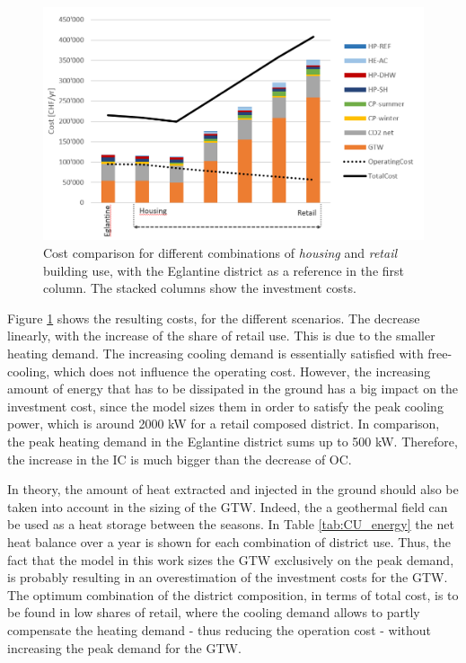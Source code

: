 \documentclass{article}
\begin{document}
\begin{figure}[htp]
	\centering
	\includegraphics[width=1\textwidth]{CU_SA_TC.png}
	\caption{Cost comparison for different combinations of \textit{housing} and \textit{retail} building use, with the Eglantine district as a reference in the first column. The stacked columns show the investment costs.}
	\label{fig:CU_TC}
\end{figure}

Figure \ref{fig:CU_TC} shows the resulting costs, for the different scenarios. The decrease linearly, with the increase of the share of retail use. This is due to the smaller heating demand. The increasing cooling demand is essentially satisfied with free-cooling, which does not influence the operating cost. However, the increasing amount of energy that has to be dissipated in the ground has a big impact on the investment cost, since the model sizes them in order to satisfy the peak cooling power, which is around 2000 kW for a retail composed district. In comparison, the peak heating demand in the Eglantine district sums up to 500 kW. Therefore, the increase in the IC is much bigger than the decrease of OC. 

In theory, the amount of heat extracted and injected in the ground should also be taken into account in the sizing of the GTW. Indeed, the a geothermal field can be used as a heat storage between the seasons. In Table \ref{tab:CU_energy} the net heat balance over a year is shown for each combination of district use. Thus, the fact that the model in this work sizes the GTW exclusively on the peak demand, is probably resulting in an overestimation of the investment costs for the GTW. \\

The optimum combination of the district composition, in terms of total cost, is to be found in low shares of retail, where the cooling demand allows to partly compensate the heating demand - thus reducing the operation cost - without increasing the peak demand for the GTW.
\end{document}
